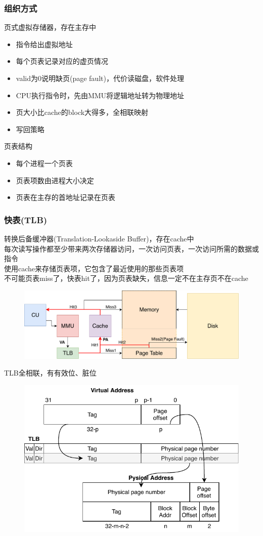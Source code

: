 \subsubsection{组织方式}
页式虚拟存储器，存在主存中
\begin{itemize}
	\item 指令给出虚拟地址
	\item 每个页表记录对应的虚页情况
	\item valid为0说明缺页(page fault)，代价读磁盘，软件处理
	\item CPU执行指令时，先由MMU将逻辑地址转为物理地址
	\item 页大小比cache的block大得多，全相联映射
	\item 写回策略
\end{itemize}
页表结构
\begin{itemize}
	\item 每个进程一个页表
	\item 页表项数由进程大小决定
	\item 页表在主存的首地址记录在页表
\end{itemize}

\subsubsection{快表(TLB)}
转换后备缓冲器(Translation-Lookaside Buffer)，存在cache中\\
每次读写操作都至少带来两次存储器访问，一次访问页表，一次访问所需的数据或指令\\
使用cache来存储页表项，它包含了最近使用的那些页表项\\
不可能页表miss了，快表hit了，因为页表缺失，信息一定不在主存页不在cache
\begin{figure}[H]
\centering
\includegraphics[width=0.8\linewidth]{fig/Cache-page.pdf}
\end{figure}
TLB全相联，有有效位、脏位
\begin{figure}[H]
\centering
\includegraphics[width=0.6\linewidth]{fig/Cache-page_address.pdf}
\end{figure}